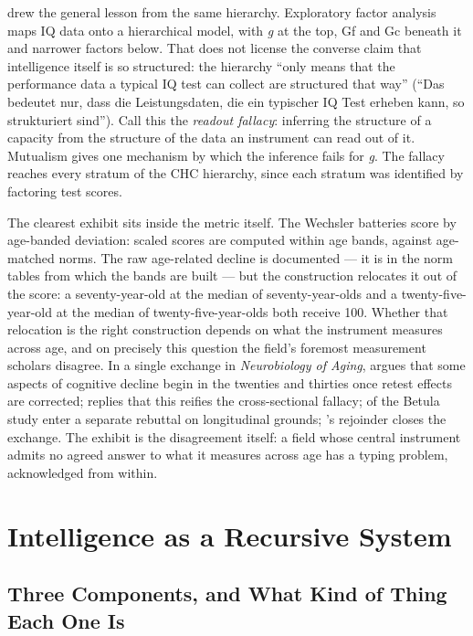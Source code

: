 \documentclass[12pt,a4paper]{article}
\begin{document}
\citet[p.~45]{Gruber2015} drew the general lesson from the same hierarchy. Exploratory factor analysis maps IQ data onto a hierarchical model, with \emph{g} at the top, Gf and Gc beneath it and narrower factors below. That does not license the converse claim that intelligence itself is so structured: the hierarchy ``only means that the performance data a typical IQ test can collect are structured that way'' (``Das bedeutet nur, dass die Leistungsdaten, die ein typischer IQ Test erheben kann, so strukturiert sind''). Call this the \emph{readout fallacy}: inferring the structure of a capacity from the structure of the data an instrument can read out of it. Mutualism gives one mechanism by which the inference fails for \emph{g}. The fallacy reaches every stratum of the CHC hierarchy, since each stratum was identified by factoring test scores.

The clearest exhibit sits inside the metric itself. The Wechsler batteries score by age-banded deviation: scaled scores are computed within age bands, against age-matched norms. The raw age-related decline is documented ---\hspace{0pt} it is in the norm tables from which the bands are built ---\hspace{0pt} but the construction relocates it out of the score: a seventy-year-old at the median of seventy-year-olds and a twenty-five-year-old at the median of twenty-five-year-olds both receive 100. Whether that relocation is the right construction depends on what the instrument measures across age, and on precisely this question the field's foremost measurement scholars disagree. In a single exchange in \emph{Neurobiology of Aging}, \citet{Salthouse2009a} argues that some aspects of cognitive decline begin in the twenties and thirties once retest effects are corrected; \citet{Schaie2009} replies that this reifies the cross-sectional fallacy; \citet{Nilsson2009} of the Betula study enter a separate rebuttal on longitudinal grounds; \citeauthor{Salthouse2009b}'s rejoinder \citeyearpar{Salthouse2009b} closes the exchange. The exhibit is the disagreement itself: a field whose central instrument admits no agreed answer to what it measures across age has a typing problem, acknowledged from within.

\section{Intelligence as a Recursive System}

\subsection{Three Components, and What Kind of Thing Each One Is}
\end{document}
